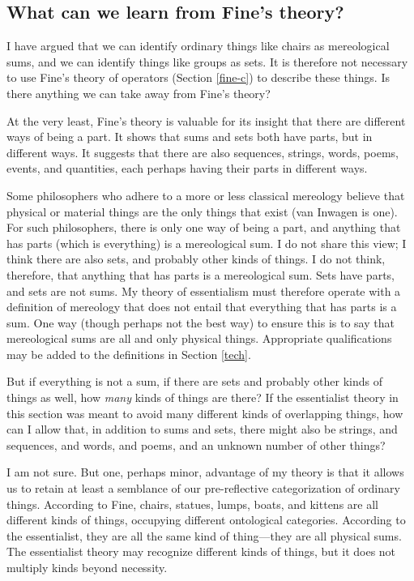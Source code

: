 \documentclass[11pt]{article}
\begin{document}
\begin{spacing}{1.5}
\subsection{What can we learn from Fine's theory?}
\label{need-fine}
I have argued that we can identify ordinary things like chairs as
mereological sums, and we can identify things like groups as sets.  It
is therefore not necessary to use Fine's theory of operators (Section
\ref{fine-c}) to describe these things.  Is there anything we can take
away from Fine's theory?

At the very least, Fine's theory is valuable for its insight that
there are different ways of being a part.  It shows that sums and sets
both have parts, but in different ways.  It suggests that there are
also sequences, strings, words, poems, events, and quantities, each
perhaps having their parts in different ways.

Some philosophers who adhere to a more or less classical mereology
believe that physical or material things are the only things that
exist (van Inwagen is one).  For such philosophers, there is only one
way of being a part, and anything that has parts (which is everything)
is a mereological sum.  I do not share this view; I think there are
also sets, and probably other kinds of things.  I do not think,
therefore, that anything that has parts is a mereological sum.  Sets
have parts, and sets are not sums.  My theory of essentialism must
therefore operate with a definition of mereology that does not entail
that everything that has parts is a sum.  One way (though perhaps not
the best way) to ensure this is to say that mereological sums are all
and only physical things.  Appropriate qualifications may be added to
the definitions in Section \ref{tech}.

But if everything is not a sum, if there are sets and probably other
kinds of things as well, how {\em many} kinds of things are there?  If
the essentialist theory in this section was meant to avoid many
different kinds of overlapping things, how can I allow that, in
addition to sums and sets, there might also be strings, and sequences,
and words, and poems, and an unknown number of other things?

I am not sure.  But one, perhaps minor, advantage of my theory is that
it allows us to retain at least a semblance of our pre-reflective
categorization of ordinary things.  According to Fine, chairs,
statues, lumps, boats, and kittens are all different kinds of things,
occupying different ontological categories.  According to the
essentialist, they are all the same kind of thing---they are all
physical sums.  The essentialist theory may recognize different kinds
of things, but it does not multiply kinds beyond necessity.


\end{spacing}
\end{document}
